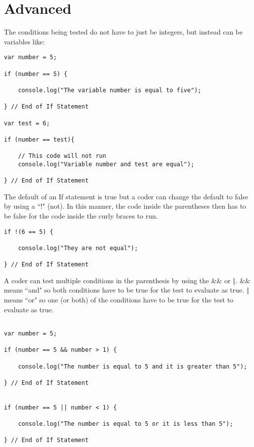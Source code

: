 \documentclass[12pt, letterpaper]{article}
\begin{document}
\section*{Advanced}

The conditions being tested do not have to just be integers, but instead can be variables like: \\

\begin{lstlisting}
var number = 5;

if (number == 5) {

	console.log("The variable number is equal to five");

} // End of If Statement

var test = 6;

if (number == test){

	// This code will not run
	console.log("Variable number and test are equal");

} // End of If Statement
\end{lstlisting}
The default of an If statement is true but a coder can change the default to false by using a ``!" (not). In this manner, the code inside the parentheses then has to be false for the code inside the curly braces to run. \\

\begin{lstlisting}
if !(6 == 5) {

	console.log("They are not equal");

} // End of If Statement
\end{lstlisting}
A coder can test multiple conditions in the parenthesis by using the \&\& or  $\Vert$. \&\& means ``and" so both conditions have to be true for the test to evaluate as true. $\Vert$ means ``or" so one (or both) of the conditions have to be true for the test to evaluate as true.

\begin{lstlisting}

var number = 5;

if (number == 5 && number > 1) {

	console.log("The number is equal to 5 and it is greater than 5");

} // End of If Statement


if (number == 5 || number < 1) {

	console.log("The number is equal to 5 or it is less than 5");

} // End of If Statement

\end{lstlisting}
\end{document}
